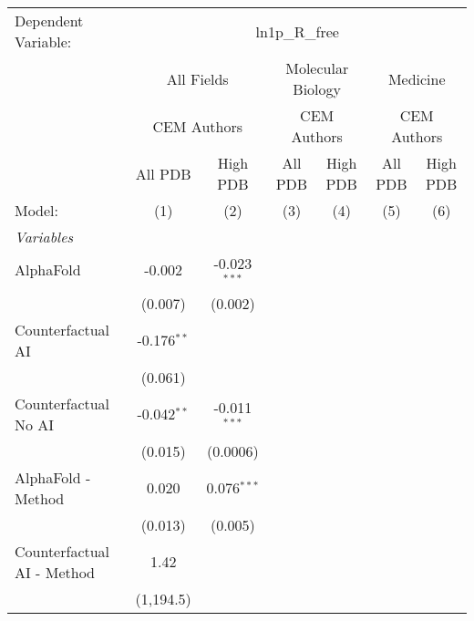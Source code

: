 \begingroup
\centering
\begin{tabular}{lcccccc}
   \tabularnewline \midrule \midrule
   Dependent Variable: & \multicolumn{6}{c}{ln1p\_R\_free}\\
 & \multicolumn{2}{c}{All Fields} & \multicolumn{2}{c}{Molecular Biology} & \multicolumn{2}{c}{Medicine} \\
\cmidrule(lr){2-3} \cmidrule(lr){4-5} \cmidrule(lr){6-7}
 & \multicolumn{2}{c}{CEM Authors} & \multicolumn{2}{c}{CEM Authors} & \multicolumn{2}{c}{CEM Authors} \\
\cmidrule(lr){2-3} \cmidrule(lr){4-5} \cmidrule(lr){6-7}
 & \multicolumn{1}{c}{All PDB} & \multicolumn{1}{c}{High PDB} & \multicolumn{1}{c}{All PDB} & \multicolumn{1}{c}{High PDB} & \multicolumn{1}{c}{All PDB} & \multicolumn{1}{c}{High PDB} \\
\cmidrule(lr){2-2} \cmidrule(lr){3-3} \cmidrule(lr){4-4} \cmidrule(lr){5-5} \cmidrule(lr){6-6} \cmidrule(lr){7-7}
   Model:                                   & (1)           & (2)            & (3) & (4) & (5) & (6)\\  
   \midrule
   \emph{Variables}\\
   AlphaFold                                & -0.002        & -0.023$^{***}$ &     &     &     &   \\   
                                            & (0.007)       & (0.002)        &     &     &     &   \\   
   Counterfactual AI                        & -0.176$^{**}$ &                &     &     &     &   \\   
                                            & (0.061)       &                &     &     &     &   \\   
   Counterfactual No AI                     & -0.042$^{**}$ & -0.011$^{***}$ &     &     &     &   \\   
                                            & (0.015)       & (0.0006)       &     &     &     &   \\   
   AlphaFold - Method                       & 0.020         & 0.076$^{***}$  &     &     &     &   \\   
                                            & (0.013)       & (0.005)        &     &     &     &   \\   
   Counterfactual AI - Method               & 1.42          &                &     &     &     &   \\   
                                            & (1,194.5)     &                &     &     &     &   \\   

\end{tabular}
